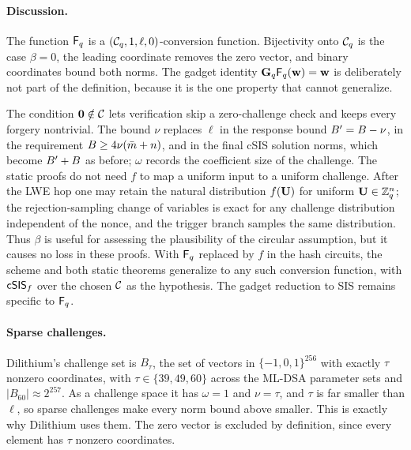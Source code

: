 \paragraph*{Discussion.} The function $\mathsf{F}_q$ is a $(\mathcal{C}_q, 1, \ell, 0)$-conversion function. Bijectivity onto $\mathcal{C}_q$ is the case $\beta = 0$, the leading coordinate removes the zero vector, and binary coordinates bound both norms. The gadget identity $\mathbf{G}_q \mathsf{F}_q(\mathbf{w}) = \mathbf{w}$ is deliberately not part of the definition, because it is the one property that cannot generalize.

The condition $\mathbf{0} \notin \mathcal{C}$ lets verification skip a zero-challenge check and keeps every forgery nontrivial. The bound $\nu$ replaces $\ell$ in the response bound $B' = B - \nu$, in the requirement $B \ge 4\nu(\bar m+n)$, and in the final cSIS solution norms, which become $B' + B$ as before; $\omega$ records the coefficient size of the challenge. The static proofs do not need $f$ to map a uniform input to a uniform challenge. After the LWE hop one may retain the natural distribution $f(\mathbf{U})$ for uniform $\mathbf{U}\in\mathbb{Z}_q^n$; the rejection-sampling change of variables is exact for any challenge distribution independent of the nonce, and the trigger branch samples the same distribution. Thus $\beta$ is useful for assessing the plausibility of the circular assumption, but it causes no loss in these proofs. With $\mathsf{F}_q$ replaced by $f$ in the hash circuits, the scheme and both static theorems generalize to any such conversion function, with $\mathsf{cSIS}_f$ over the chosen $\mathcal{C}$ as the hypothesis. The gadget reduction to SIS remains specific to $\mathsf{F}_q$. 

\paragraph*{Sparse challenges.} Dilithium's challenge set is $B_\tau$, the set of vectors in $\{-1,0,1\}^{256}$ with exactly $\tau$ nonzero coordinates, with $\tau \in \{39, 49, 60\}$ across the ML-DSA parameter sets and $|B_{60}| \approx 2^{257}$. As a challenge space it has $\omega = 1$ and $\nu = \tau$, and $\tau$ is far smaller than $\ell$, so sparse challenges make every norm bound above smaller. This is exactly why Dilithium uses them. The zero vector is excluded by definition, since every element has $\tau$ nonzero coordinates.

